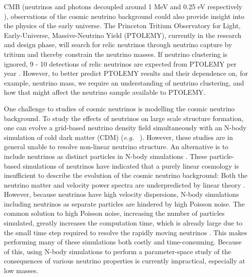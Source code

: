 \documentclass[twocolumn,superscriptaddress,prd]{revtex4}
\newcommand{\eg}{\textit{e.g.}~}
\newcommand{\ptolemy}{PTOLEMY }
\newcommand{\ptolemyns}{PTOLEMY}
\begin{document}
CMB (neutrinos and photons decoupled around 1 MeV
and 0.25 eV respectively \cite{schneider}),
observations of the cosmic neutrino background could also provide
insight into the physics of the early universe.
The Princeton Tritium Observatory for Light, Early-Universe,
Massive-Neutrino Yield (\ptolemyns), currently in the research and design
phase, will search for relic neutrinos through neutrino capture by
tritium and thereby constrain the
neutrino masses.  
If neutrino
clustering is ignored, 9 - 10 detections of relic neutrinos are
expected from \ptolemy per year \cite{ptolemy}.  However, to better predict \ptolemy
results and their dependence on, for example, neutrino mass,
we require an understanding of neutrino clustering, and how that might
affect the neutrino sample available to \ptolemyns.



One challenge to studies of cosmic neutrinos is
modelling the cosmic neutrino background.  
To study the effects of neutrinos on large scale structure formation,
one can evolve
a grid-based neutrino
density field simultaneously with an N-body simulation of 
cold dark matter (CDM) (\eg
\cite{brandbyge08}).  However, these studies are in general
unable to resolve non-linear neutrino structure.
An alternative is to include neutrinos as
distinct particles in N-body simulations \cite{bird12,inman15}.
These particle-based simulations of neutrinos have
indicated that a purely linear cosmology is insufficient to describe
the evolution of the cosmic neutrino background: Both the neutrino
matter 
and velocity power spectra are underpredicted by linear
  theory \cite{brandbyge09,inman15}.
However, because neutrinos have high
velocity dispersions, N-body simulations including neutrinos as separate
particles are hindered by high Poisson noise. The
common solution to high Poisson noise,  increasing the
number 
of particles simulated, greatly increases the computation
time, which is already large due to the small time
step required to resolve the rapidly moving neutrinos \cite{brandbyge082,brandbyge08,brandbyge09}.  This
makes performing many of these simulations both costly and
time-consuming. 
 Because of this, using N-body simulations to perform a parameter-space 
study of the consequences of
various neutrino properties is currently
impractical, especially at low masses. 
\end{document}
